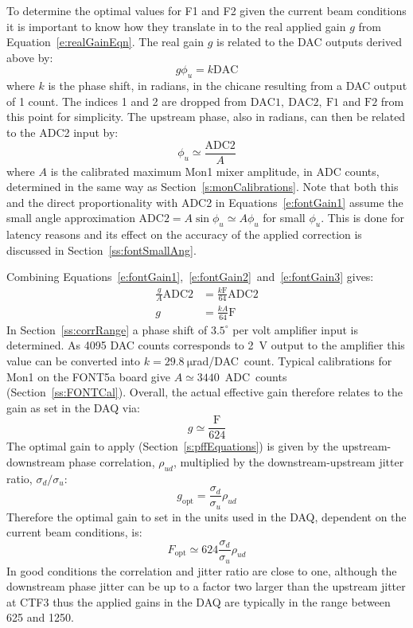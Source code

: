 To determine the optimal values for F1 and F2 given the current beam conditions it is important to know how they translate in to the real applied gain \(g\) from Equation~\ref{e:realGainEqn}. The real gain \(g\) is related to the DAC outputs derived above by:
\begin{equation} \label{e:fontGain2}
g\phi_u = k\mathrm{DAC}
\end{equation}
where \(k\) is the phase shift, in radians, in the chicane resulting from a DAC output of 1 count. The indices 1 and 2 are dropped from \(\mathrm{DAC1,~DAC2,~F1}\) and \(\mathrm{F2}\) from this point for simplicity. The upstream phase, also in radians, can then be related to the ADC2 input by:
\begin{equation} \label{e:fontGain3}
\phi_u \simeq \frac{\mathrm{ADC2}}{A}
\end{equation}
where \(A\) is the calibrated maximum Mon1 mixer amplitude, in ADC counts, determined in the same way as Section~\ref{s:monCalibrations}. Note that both this and the direct proportionality with ADC2 in Equations~\ref{e:fontGain1} assume the small angle approximation \(\mathrm{ADC2} = A\sin\phi_u \simeq A\phi_u\) for small \(\phi_u\). This is done for latency reasons \cite{glennPriv} and its effect on the accuracy of the applied correction is discussed in Section~\ref{ss:fontSmallAng}.

Combining Equations~\ref{e:fontGain1},~\ref{e:fontGain2}~and~\ref{e:fontGain3} gives:
\begin{align}
\frac{g}{A}\mathrm{ADC2} &= \frac{k\mathrm{F}}{64}\mathrm{ADC2} \nonumber \\
g &= \frac{kA}{64}\mathrm{F} \label{e:fontGain4}
\end{align}
In Section~\ref{ss:corrRange} a phase shift of \(3.5^\circ\) per volt amplifier input is determined. As 4095 DAC counts corresponds to 2~V output to the amplifier this value can be converted into \(k = 29.8~\mathrm{\mu}\)rad/DAC~count. Typical calibrations for Mon1 on the FONT5a board give \(A \simeq 3440\)~ADC~counts (Section~\ref{ss:FONTCal}). Overall, the actual effective gain therefore relates to the gain as set in the DAQ via:
\begin{equation}
g \simeq \frac{\mathrm{F}}{624}
\end{equation}
The optimal gain to apply (Section~\ref{s:pffEquations}) is given by the upstream-downstream phase correlation, \(\rho_{ud}\), multiplied by the downstream-upstream jitter ratio, \(\sigma_{d}/\sigma_{u}\):
\begin{equation}
g_{\mathrm{opt}} = \frac{\sigma_{d}}{\sigma_{u}} \rho_{ud}  
\end{equation}
Therefore the optimal gain to set in the units used in the DAQ, dependent on the current beam conditions, is:
\begin{equation}
F_{\mathrm{opt}} \simeq 624 \frac{\sigma_{d}}{\sigma_{u}} \rho_{ud}
\label{e:fontOptGain}
\end{equation}
In good conditions the correlation and jitter ratio are close to one, although the downstream phase jitter can be up to a factor two larger than the upstream jitter at CTF3 thus the applied gains in the DAQ are typically in the range between 625 and 1250.

